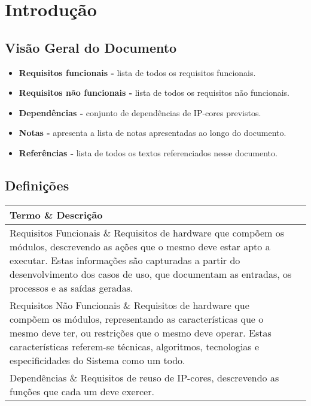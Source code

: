 \documentclass{article}
\begin{document}
\newpage

\tableofcontents
\newpage

\section{Introdução}

\subsection{Visão Geral do Documento}
  \begin{itemize}
   \item \textbf{Requisitos funcionais -} lista de todos os requisitos funcionais.
   \item \textbf{Requisitos não funcionais -} lista de todos os requisitos não funcionais.
   \item \textbf{Dependências -} conjunto de dependências de IP-cores previstos.
   \item \textbf{Notas -} apresenta a lista de notas apresentadas ao longo do documento.
   \item \textbf{Referências -} lista de todos os textos referenciados nesse documento.
  \end{itemize}

  \subsection{Definições}
    \FloatBarrier
    \begin{table}[H]
      \begin{center}
        \begin{tabular}[pos]{|m{5cm} | m{9cm}|}
          \hline
          \cellcolor[gray]{0.9}\textbf{Termo} \& \cellcolor[gray]{0.9}\textbf{Descrição} \\ \hline
          Requisitos Funcionais \& Requisitos de hardware que compõem os módulos, descrevendo as ações que o mesmo deve estar apto a executar. Estas informações são capturadas a partir do desenvolvimento dos casos de uso, que documentam as entradas, os processos e as saídas geradas.  \\ \hline
          Requisitos Não Funcionais \& Requisitos de hardware que compõem os módulos, representando as características que o mesmo deve ter, ou restrições que o mesmo deve operar. Estas características referem-se técnicas, algoritmos, tecnologias e especificidades do Sistema como um todo.  \\ \hline
          Dependências \& Requisitos de reuso de IP-cores, descrevendo as funções que cada um deve exercer. \\ \hline
        \end{tabular}
      \end{center}
    \end{table}
\end{document}
